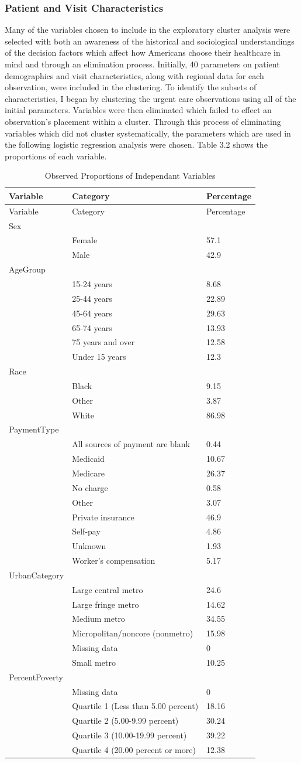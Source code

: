\documentclass[12pt,twoside]{reedthesis}
\begin{document}
  \subsubsection{Patient and Visit
  Characteristics}\label{patient-and-visit-characteristics}
  
  Many of the variables chosen to include in the exploratory cluster
  analysis were selected with both an awareness of the historical and
  sociological understandings of the decision factors which affect how
  Americans choose their healthcare in mind and through an elimination
  process. Initially, 40 parameters on patient demographics and visit
  characteristics, along with regional data for each observation, were
  included in the clustering. To identify the subsets of characteristics,
  I began by clustering the urgent care observations using all of the
  initial parameters. Variables were then eliminated which failed to
  effect an observation's placement within a cluster. Through this process
  of eliminating variables which did not cluster systematically, the
  parameters which are used in the following logistic regression analysis
  were chosen. Table 3.2 shows the proportions of each variable.
  
  \singlespacing
  
  \begin{longtable}[c]{@{}lll@{}}
  \caption{Observed Proportions of Independant Variables
  \label{tab:sums}}\tabularnewline
  \toprule
  Variable & Category & Percentage\tabularnewline
  \midrule
  \endfirsthead
  \toprule
  Variable & Category & Percentage\tabularnewline
  \midrule
  \endhead
  Sex & &\tabularnewline
  & Female & 57.1\tabularnewline
  & Male & 42.9\tabularnewline
  AgeGroup & &\tabularnewline
  & 15-24 years & 8.68\tabularnewline
  & 25-44 years & 22.89\tabularnewline
  & 45-64 years & 29.63\tabularnewline
  & 65-74 years & 13.93\tabularnewline
  & 75 years and over & 12.58\tabularnewline
  & Under 15 years & 12.3\tabularnewline
  Race & &\tabularnewline
  & Black & 9.15\tabularnewline
  & Other & 3.87\tabularnewline
  & White & 86.98\tabularnewline
  PaymentType & &\tabularnewline
  & All sources of payment are blank & 0.44\tabularnewline
  & Medicaid & 10.67\tabularnewline
  & Medicare & 26.37\tabularnewline
  & No charge & 0.58\tabularnewline
  & Other & 3.07\tabularnewline
  & Private insurance & 46.9\tabularnewline
  & Self-pay & 4.86\tabularnewline
  & Unknown & 1.93\tabularnewline
  & Worker's compensation & 5.17\tabularnewline
  UrbanCategory & &\tabularnewline
  & Large central metro & 24.6\tabularnewline
  & Large fringe metro & 14.62\tabularnewline
  & Medium metro & 34.55\tabularnewline
  & Micropolitan/noncore (nonmetro) & 15.98\tabularnewline
  & Missing data & 0\tabularnewline
  & Small metro & 10.25\tabularnewline
  PercentPoverty & &\tabularnewline
  & Missing data & 0\tabularnewline
  & Quartile 1 (Less than 5.00 percent) & 18.16\tabularnewline
  & Quartile 2 (5.00-9.99 percent) & 30.24\tabularnewline
  & Quartile 3 (10.00-19.99 percent) & 39.22\tabularnewline
  & Quartile 4 (20.00 percent or more) & 12.38\tabularnewline
  \bottomrule
  \end{longtable}
  
\end{document}
